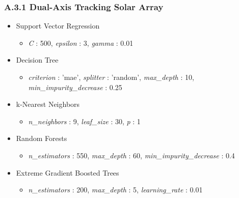 \subsubsection*{A.3.1 \hspace{0.5em} Dual-Axis Tracking Solar Array}
\begin{itemize}
    \item Support Vector Regression
    \begin{itemize}
        \item \textit{C} : 500, \textit{epsilon} : 3,  \textit{gamma} : 0.01
    \end{itemize}

    \item Decision Tree 
    \begin{itemize}
        \item \textit{criterion} : 'mae', \textit{splitter} : 'random', \textit{max\_depth} : 10, \textit{min\_impurity\_decrease} : 0.25
    \end{itemize}

    \item k-Nearest Neighbors 
    \begin{itemize}
        \item \textit{n\_neighbors} : 9, \textit{leaf\_size} : 30, \textit{p} : 1
    \end{itemize}

    \item Random Forests 
    \begin{itemize}
        \item \textit{n\_estimators} : 550, \textit{max\_depth} : 60, \textit{min\_impurity\_decrease} : 0.4
    \end{itemize}

    \item Extreme Gradient Boosted Trees
    \begin{itemize}
        \item \textit{n\_estimators} : 200, \textit{max\_depth} : 5, \textit{learning\_rate} : 0.01 
    \end{itemize}

\end{itemize}

